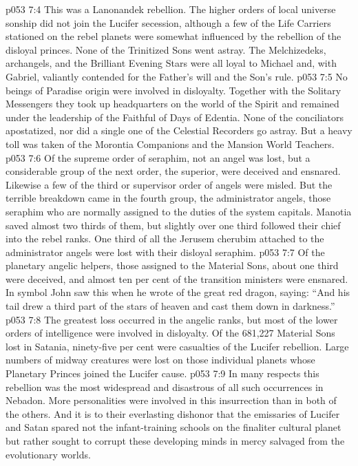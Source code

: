 \vs p053 7:4 This was a Lanonandek rebellion. The higher orders of local universe sonship did not join the Lucifer secession, although a few of the Life Carriers stationed on the rebel planets were somewhat influenced by the rebellion of the disloyal princes. None of the Trinitized Sons went astray. The Melchizedeks, archangels, and the Brilliant Evening Stars were all loyal to Michael and, with Gabriel, valiantly contended for the Father’s will and the Son’s rule.
\vs p053 7:5 No beings of Paradise origin were involved in disloyalty. Together with the Solitary Messengers they took up headquarters on the world of the Spirit and remained under the leadership of the Faithful of Days of Edentia. None of the conciliators apostatized, nor did a single one of the Celestial Recorders go astray. But a heavy toll was taken of the Morontia Companions and the Mansion World Teachers.
\vs p053 7:6 Of the supreme order of seraphim, not an angel was lost, but a considerable group of the next order, the superior, were deceived and ensnared. Likewise a few of the third or supervisor order of angels were misled. But the terrible breakdown came in the fourth group, the administrator angels, those seraphim who are normally assigned to the duties of the system capitals. Manotia saved almost two thirds of them, but slightly over one third followed their chief into the rebel ranks. One third of all the Jerusem cherubim attached to the administrator angels were lost with their disloyal seraphim.
\vs p053 7:7 Of the planetary angelic helpers, those assigned to the Material Sons, about one third were deceived, and almost ten per cent of the transition ministers were ensnared. In symbol John saw this when he wrote of the great red dragon, saying: “And his tail drew a third part of the stars of heaven and cast them down in darkness.”
\vs p053 7:8 The greatest loss occurred in the angelic ranks, but most of the lower orders of intelligence were involved in disloyalty. Of the 681,227 Material Sons lost in Satania, ninety\hyp{}five per cent were casualties of the Lucifer rebellion. Large numbers of midway creatures were lost on those individual planets whose Planetary Princes joined the Lucifer cause.
\vs p053 7:9 \pc In many respects this rebellion was the most widespread and disastrous of all such occurrences in Nebadon. More personalities were involved in this insurrection than in both of the others. And it is to their everlasting dishonor that the emissaries of Lucifer and Satan spared not the infant\hyp{}training schools on the finaliter cultural planet but rather sought to corrupt these developing minds in mercy salvaged from the evolutionary worlds.
